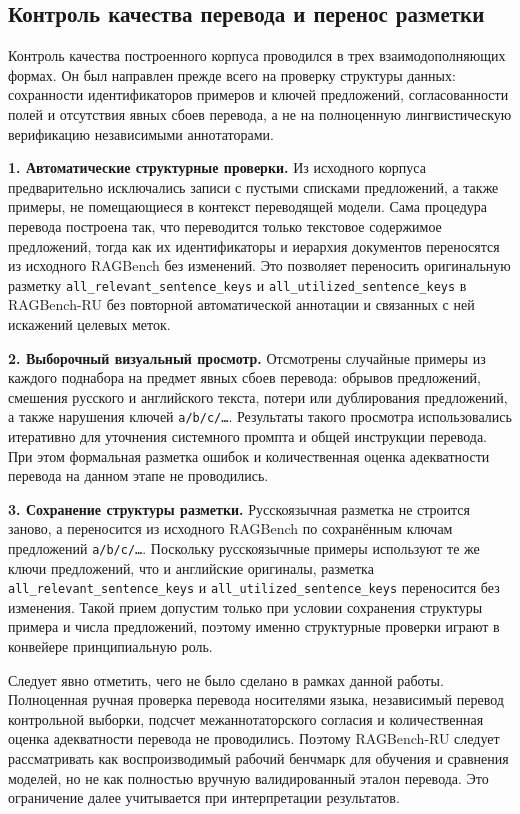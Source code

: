 \subsection{Контроль качества перевода и перенос разметки}
\label{sec:llm_eval}

Контроль качества построенного корпуса проводился в трех взаимодополняющих формах.
Он был направлен прежде всего на проверку структуры данных: сохранности идентификаторов
примеров и ключей предложений, согласованности полей и отсутствия явных сбоев перевода,
а не на полноценную лингвистическую верификацию независимыми аннотаторами.


\textbf{1. Автоматические структурные проверки.}
Из исходного корпуса предварительно исключались записи с пустыми списками
предложений, а также примеры, не помещающиеся в контекст переводящей модели.
Сама процедура перевода построена так, что переводится только текстовое
содержимое предложений, тогда как их идентификаторы и иерархия документов
переносятся из исходного RAGBench без изменений. Это позволяет переносить
оригинальную разметку \texttt{all\_relevant\_sentence\_keys} и
\texttt{all\_utilized\_sentence\_keys} в RAGBench-RU без повторной автоматической
аннотации и связанных с ней искажений целевых меток.

\textbf{2. Выборочный визуальный просмотр.}
Отсмотрены случайные примеры из каждого поднабора на предмет явных
сбоев перевода: обрывов предложений, смешения русского и английского текста, потери или
дублирования предложений, а также нарушения ключей \texttt{a/b/c/\dots}. Результаты
такого просмотра использовались итеративно для уточнения системного промпта и общей
инструкции перевода. При этом формальная разметка ошибок и количественная оценка
адекватности перевода на данном этапе не проводились.

\textbf{3. Сохранение структуры разметки.}
Русскоязычная разметка не строится заново, а переносится из исходного RAGBench по
сохранённым ключам предложений \texttt{a/b/c/\dots}. Поскольку русскоязычные примеры
используют те же ключи предложений, что и английские оригиналы, разметка
\texttt{all\_relevant\_sentence\_keys} и \texttt{all\_utilized\_sentence\_keys}
переносится без изменения. Такой прием допустим только при условии сохранения структуры
примера и числа предложений, поэтому именно структурные проверки играют в конвейере
принципиальную роль.

Следует явно отметить, чего не было сделано в рамках данной работы. Полноценная
ручная проверка перевода носителями языка, независимый перевод контрольной выборки,
подсчет межаннотаторского согласия и количественная оценка адекватности перевода
не проводились. Поэтому RAGBench-RU следует рассматривать как воспроизводимый рабочий
бенчмарк для обучения и сравнения моделей, но не как полностью вручную валидированный
эталон перевода. Это ограничение далее учитывается при интерпретации результатов.

